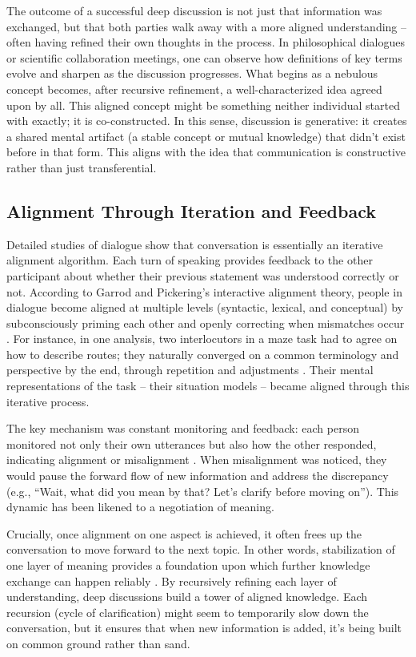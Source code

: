 \documentclass{article}
\begin{document}
The outcome of a successful deep discussion is not just that information was exchanged, but that both parties walk away with a more aligned understanding -- often having refined their own thoughts in the process. In philosophical dialogues or scientific collaboration meetings, one can observe how definitions of key terms evolve and sharpen as the discussion progresses. What begins as a nebulous concept becomes, after recursive refinement, a well-characterized idea agreed upon by all. This aligned concept might be something neither individual started with exactly; it is co-constructed. In this sense, discussion is generative: it creates a shared mental artifact (a stable concept or mutual knowledge) that didn't exist before in that form. This aligns with the idea that communication is constructive rather than just transferential.

\subsection{Alignment Through Iteration and Feedback}

Detailed studies of dialogue show that conversation is essentially an iterative alignment algorithm. Each turn of speaking provides feedback to the other participant about whether their previous statement was understood correctly or not. According to Garrod and Pickering's interactive alignment theory, people in dialogue become aligned at multiple levels (syntactic, lexical, and conceptual) by subconsciously priming each other and openly correcting when mismatches occur \citep{pickering2004, pmc9791477}. For instance, in one analysis, two interlocutors in a maze task had to agree on how to describe routes; they naturally converged on a common terminology and perspective by the end, through repetition and adjustments \citep{pmc9791477}. Their mental representations of the task -- their situation models -- became aligned through this iterative process.

The key mechanism was constant monitoring and feedback: each person monitored not only their own utterances but also how the other responded, indicating alignment or misalignment \citep{pmc9791477}. When misalignment was noticed, they would pause the forward flow of new information and address the discrepancy (e.g., ``Wait, what did you mean by that? Let's clarify before moving on''). This dynamic has been likened to a negotiation of meaning.

Crucially, once alignment on one aspect is achieved, it often frees up the conversation to move forward to the next topic. In other words, stabilization of one layer of meaning provides a foundation upon which further knowledge exchange can happen reliably \citep{pmc9791477}. By recursively refining each layer of understanding, deep discussions build a tower of aligned knowledge. Each recursion (cycle of clarification) might seem to temporarily slow down the conversation, but it ensures that when new information is added, it's being built on common ground rather than sand.
\end{document}

